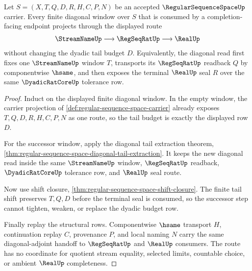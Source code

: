 \begin{theorem}
\label{thm:regular-sequence-space-diagonal-adjoint-handoff}
Let $S=(X,T,Q,D,R,H,C,P,N)$ be an accepted $\RegularSequenceSpaceUp$ carrier. Every finite diagonal window over $S$ that is consumed by a completion-facing endpoint projects through the displayed route
$$
\StreamNameUp \longrightarrow \RegSeqRatUp \longrightarrow \RealUp
$$
without changing the dyadic tail budget $D$. Equivalently, the diagonal read first fixes one $\StreamNameUp$ window $T$, transports its $\RegSeqRatUp$ readback $Q$ by componentwise $\hsame$, and then exposes the terminal $\RealUp$ seal $R$ over the same $\DyadicRatCoreUp$ tolerance row.
\end{theorem}
\begin{proof}
Induct on the displayed finite diagonal window. In the empty window, the carrier projection of \autoref{def:regular-sequence-space-carrier} already exposes $T,Q,D,R,H,C,P,N$ as one route, so the tail budget is exactly the displayed row $D$.

For the successor window, apply the diagonal tail extraction theorem, \autoref{thm:regular-sequence-space-diagonal-tail-extraction}. It keeps the new diagonal read inside the same $\StreamNameUp$ window, $\RegSeqRatUp$ readback, $\DyadicRatCoreUp$ tolerance row, and $\RealUp$ seal route.

Now use shift closure, \autoref{thm:regular-sequence-space-shift-closure}. The finite tail shift preserves $T,Q,D$ before the terminal seal is consumed, so the successor step cannot tighten, weaken, or replace the dyadic budget row.

Finally replay the structural rows. Componentwise $\hsame$ transport $H$, continuation replay $C$, provenance $P$, and local naming $N$ carry the same diagonal-adjoint handoff to $\RegSeqRatUp$ and $\RealUp$ consumers. The route has no coordinate for quotient stream equality, selected limits, countable choice, or ambient $\RealUp$ completeness.
\end{proof}
